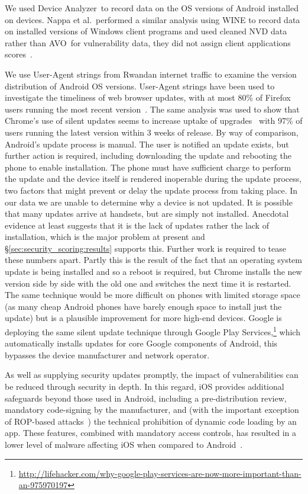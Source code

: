\documentclass{sig-alternate-2013}
\newcommand{\da}{Device Analyzer}
\newcommand{\avo}{AVO}
\begin{document}
We used \da\ to record data on the OS versions of Android installed on devices.
Nappa et al.\ performed a similar analysis using WINE to record data on installed versions of Windows client programs and used cleaned NVD data rather than \avo\ for vulnerability data, they did not assign client applications scores~\cite{Nappa2015}.


We use User-Agent strings from Rwandan internet traffic to examine the version distribution of Android OS versions.
User-Agent strings have been used to investigate the timeliness of web browser updates, with at most 80\% of Firefox users running the most recent version~\cite{Frei2008}.
The same analysis was used to show that Chrome's use of silent updates seems to increase uptake of upgrades~\cite{Duebendorfer2010} with 97\% of users running the latest version within 3 weeks of release.
By way of comparison, Android's update process is manual.
The user is notified an update exists, but further action is required, including downloading the update and rebooting the phone to enable installation.
The phone must have sufficient charge to perform the update and the device itself is rendered inoperable during the update process, two factors that might prevent or delay the update process from taking place.
In our data we are unable to determine why a device is not updated. 
It is possible that many updates arrive at handsets, but are simply not installed.
Anecdotal evidence at least suggests that it is the lack of updates rather the lack of installation, which is the major problem at present and \S\ref{sec:security_scoring:results} supports this. Further work is required to tease these numbers apart.
Partly this is the result of the fact that an operating system update is being installed and so a reboot is required, but Chrome installs the new version side by side with the old one and switches the next time it is restarted.
The same technique would be more difficult on phones with limited storage space (as many cheap Android phones have barely enough space to install just the update) but is a plausible improvement for more high-end devices.
Google is deploying the same silent update technique through Google Play Services,\footnote{\href{http://lifehacker.com/why-google-play-services-are-now-more-important-than-an-975970197}{http://lifehacker.com/why-google-play-services-are-now-more-important-than-an-975970197}} which automatically installs updates for core Google components of Android, this bypasses the device manufacturer and network operator.

As well as supplying security updates promptly, the impact of vulnerabilities can be reduced through security in depth.
In this regard, iOS provides additional safeguards beyond those used in Android, including a pre-distribution review, mandatory code-signing by the manufacturer, and (with the important exception of ROP-based attacks~\cite{Wang2013a}) the technical prohibition of dynamic code loading by an app.
These features, combined with mandatory access controls, has resulted in a lower level of malware affecting iOS when compared to Android~\cite{Felt2011}.
\end{document}
